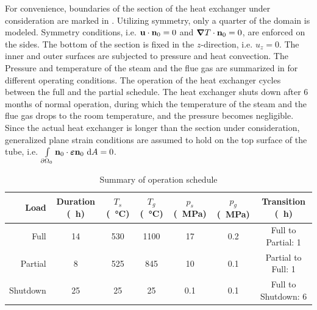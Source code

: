 For convenience, boundaries of the section of the heat exchanger under consideration are marked in . Utilizing symmetry, only a quarter of the domain is modeled. Symmetry conditions, i.e. $\textbf{u} \cdot \textbf{n}_0 = 0$ and $\boldsymbol{\nabla} T \cdot \textbf{n}_0 = 0$, are enforced on the sides. The bottom of the section is fixed in the $z$-direction, i.e. $u_z = 0$. The inner and outer surfaces are subjected to pressure and heat convection.
The Pressure and temperature of the steam and the flue gas are summarized in  for different operating conditions. The operation of the heat exchanger cycles between the full and the partial schedule. The heat exchanger shuts down after 6 months of normal operation, during which the temperature of the steam and the flue gas drops to the room temperature, and the pressure becomes negligible. Since the actual heat exchanger is longer than the section under consideration, generalized plane strain conditions are assumed to hold on the top surface of the tube, i.e. $\int\limits_{{\partial \Omega}_0} \textbf{n}_0 \cdot \boldsymbol{\varepsilon} \textbf{n}_0 \text{ d}A = 0 $.



\begin{table}[!htb]
  \small
  \centering
  \caption{Summary of operation schedule}
  \label{table: Chapter5/spallation/schedule}
  \begin{tabular}{r c c c c c c}
    \toprule
    Load     & Duration (\SI{}{\hour}) & $T_s$ (\SI{}{\celsius}) & $T_g$ (\SI{}{\celsius}) & $p_s$ (\SI{}{\mega\pascal}) & $p_g$ (\SI{}{\mega\pascal}) & Transition (\SI{}{\hour}) \\
    \midrule
    Full     & 14                      & 530                     & 1100                    & 17                          & 0.2                         & Full to Partial: 1        \\
    Partial  & 8                       & 525                     & 845                     & 10                          & 0.1                         & Partial to Full: 1        \\
    Shutdown & 25                      & 25                      & 25                      & 0.1                         & 0.1                         & Full to Shutdown: 6       \\
    \bottomrule
  \end{tabular}
\end{table}

